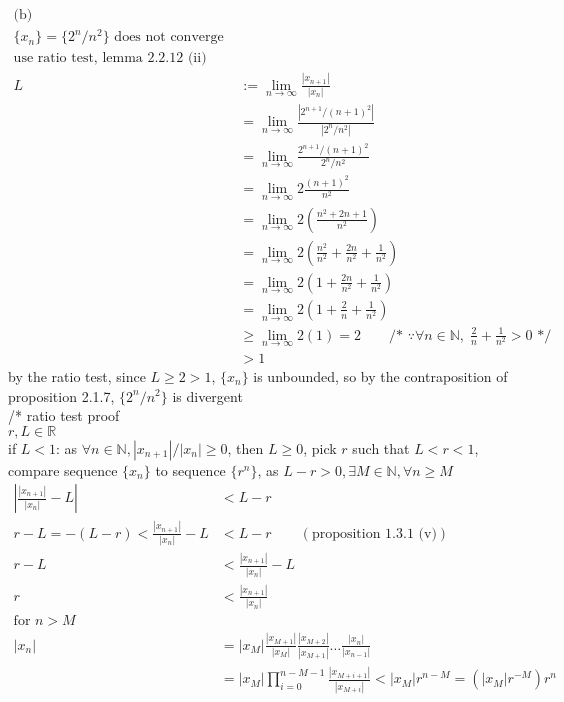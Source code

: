 \documentclass[12pt, border = 4pt, multi]{article} %
\begin{document}
\\
\\
\begin{align*}
\text{(b)} \hspace{14em}&\\
\{x_n\} = \{2 ^ n / n ^ 2\} \text{ does not converge}&\\
\text{use ratio test, lemma 2.2.12 (ii)}&\\
L &:= \lim_{n \rightarrow \infty} \frac{|x_{n + 1}|}{|x_n|}\\
&= \lim_{n \rightarrow \infty} \frac{|2 ^ {n + 1} / (n + 1) ^ 2|}{|2 ^ n / n ^ 2|}\\
&= \lim_{n \rightarrow \infty} \frac{2 ^ {n + 1} / (n + 1) ^ 2}{2 ^ n / n ^ 2}\\
&= \lim_{n \rightarrow \infty} 2\frac{(n + 1) ^ 2}{n ^ 2}\\
&= \lim_{n \rightarrow \infty} 2\left(\frac{n ^ 2 + 2n + 1}{n ^ 2}\right)\\
&= \lim_{n \rightarrow \infty} 2\left(\frac{n ^ 2}{n ^ 2} + \frac{2n}{n ^ 2} + \frac{1}{n ^ 2}\right)\\
&= \lim_{n \rightarrow \infty} 2\left(1 + \frac{2n}{n ^ 2} + \frac{1}{n ^ 2}\right)\\
&= \lim_{n \rightarrow \infty} 2\left(1 + \frac{2}{n} + \frac{1}{n ^ 2}\right)\\
&\geq \lim_{n \rightarrow \infty} 2(1) = 2 \qquad \text{/* }\because \forall n \in \mathbb{N},\;\frac{2}{n} + \frac{1}{n ^ 2} > 0 \text{ */}\\
&> 1
\end{align*}
by the ratio test, since $L \geq 2 > 1$, $\{x_n\}$ is unbounded, so by the contraposition of proposition 2.1.7, $\{2 ^ n / n ^ 2\}$ is divergent\\
/* ratio test proof\\
$r, L \in \mathbb{R}$\\
if $L < 1$: as $\forall n \in \mathbb{N}, |x_{n + 1}| / |x_n| \geq 0$, then $L \geq 0$, pick $r$ such that $L < r < 1$, compare sequence $\{x_n\}$ to sequence $\{r ^ n\}$, as $L - r > 0, \exists M \in \mathbb{N}, \forall n \geq M$\\
\begin{align*}
\left|\frac{|x_{n + 1}|}{|x_n|} - L\right| &< L - r\\
r - L = -(L - r) < \frac{|x_{n + 1}|}{|x_n|} - L &< L - r \qquad (\text{proposition 1.3.1 (v)})\\
r - L &< \frac{|x_{n + 1}|}{|x_n|} - L\\
r &< \frac{|x_{n + 1}|}{|x_n|}\\
\text{for } n > M\\
|x_n| &= |x_M|\frac{|x_{M + 1}|}{|x_M|}\frac{|x_{M + 2}|}{|x_{M + 1}|}\dots\frac{|x_n|}{|x_{n - 1}|}\\
&= |x_M|\prod_{i = 0} ^ {n - M - 1} \frac{|x_{M + i + 1}|}{|x_{M + i}|} < |x_M|r ^ {n - M} = (|x_M|r ^ {-M})r ^ n
\end{align*}
\end{document}
